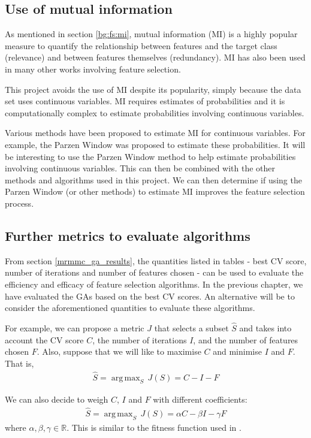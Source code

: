 \documentclass[12pt, twoside, a4paper]{report}
\DeclareMathOperator*{\argmax}{arg\,max}
\begin{document}
\subsection{Use of mutual information}
As mentioned in section \ref{bg:fs:mi}, mutual information (MI) is a highly popular measure to quantify the relationship between features and the target class (relevance) and between features themselves (redundancy). MI has also been used in many other works involving feature selection.

This project avoids the use of MI despite its popularity, simply because the data set uses continuous variables. MI requires estimates of probabilities and it is computationally complex to estimate probabilities involving continuous variables.

Various methods have been proposed to estimate MI for continuous variables. For example, the Parzen Window \cite{RefWorks:183} was proposed to estimate these probabilities. It will be interesting to use the Parzen Window method to help estimate probabilities involving continuous variables. This can then be combined with the other methods and algorithms used in this project. We can then determine if using the Parzen Window (or other methods) to estimate MI improves the feature selection process.

\subsection{Further metrics to evaluate algorithms}

From section \ref{mrmmc_ga_results}, the quantities listed in tables - best CV score, number of iterations and number of features chosen - can be used to evaluate the efficiency and efficacy of feature selection algorithms. In the previous chapter, we have evaluated the GAs based on the best CV scores. An alternative will be to consider the aforementioned quantities to evaluate these algorithms.

For example, we can propose a metric $J$ that selects a subset $\widehat{S}$ and takes into account the CV score $C$, the number of iterations $I$, and the number of features chosen $F$. Also, suppose that we will like to maximise $C$ and minimise $I$ and $F$. That is,
\begin{align*}
\widehat{S} = \argmax_{S} \, J(S) = C - I - F
\end{align*}

We can also decide to weigh $C$, $I$ and $F$ with different coefficients:
\begin{align*}
\widehat{S} = \argmax_{S} \, J(S) = \alpha C - \beta I - \gamma F
\end{align*}
where $\alpha, \beta, \gamma \in \mathbb{R}$. This is similar to the fitness function used in \cite{RefWorks:199}.

\newpage

\singlespacing
{}



\end{document}
